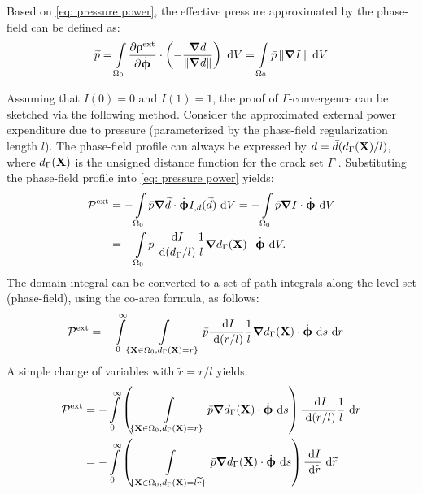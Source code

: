 \begin{remark}
  Based on \eqref{eq: pressure power}, the effective pressure approximated by the phase-field can be defined as:
  \begin{align}
    \widetilde{p} = \int\limits_{\Omega_0} \dfrac{\partial \uprho^\text{ext}}{\partial \dot{\boldsymbol{\upphi}}} \cdot \left( -\dfrac{\boldsymbol{\nabla} d}{\left\lVert\boldsymbol{\nabla} d\right\rVert} \right) \text{ d}V = \int\limits_{\Omega_0} \bar{p} \left\lVert\boldsymbol{\nabla} I\right\rVert \text{ d}V
    \label{eq:pressure_approx}
  \end{align}
\end{remark}

Assuming that $I(0)=0$ and $I(1)=1$, the proof of $\Gamma$-convergence can be sketched via the following method. Consider the approximated external power expenditure due to pressure (parameterized by the phase-field regularization length $l$). The phase-field profile can always be expressed by $d = \bar{d}(d_\Gamma(\textbf{X})/l)$, where $d_\Gamma(\textbf{X})$ is the unsigned distance function for the crack set $\Gamma$ \cite{JYWu2017}. Substituting the phase-field profile into \eqref{eq: pressure power} yields:
\begin{equation}
  \begin{aligned}
    \mathcal{P}^\text{ext} & = - \int\limits_{\Omega_0} \bar{p} \boldsymbol{\nabla} \widetilde{d} \cdot \dot{\boldsymbol{\upphi}} I_{,d}(\widetilde{d}) \text{ d}V = - \int\limits_{\Omega_0} \bar{p} \boldsymbol{\nabla} I \cdot \dot{\boldsymbol{\upphi}} \text{ d}V \\
                           & = - \int\limits_{\Omega_0} \bar{p} \dfrac{\text{ d}I}{\text{ d}(d_\Gamma/l)} \dfrac{1}{l} \boldsymbol{\nabla} d_\Gamma(\textbf{X}) \cdot \dot{\boldsymbol{\upphi}} \text{ d}V.                                    
  \end{aligned}
\end{equation}
The domain integral can be converted to a set of path integrals along the level set (phase-field), using the co-area formula, as follows:
\begin{align}
  \mathcal{P}^\text{ext} & = - \int\limits_0^\infty \int\limits_{\{ \textbf{X}\in{\Omega_0}, d_\Gamma(\textbf{X})=r \}} \bar{p} \dfrac{\text{ d}I}{\text{ d}(r/l)} \dfrac{1}{l} \boldsymbol{\nabla} d_\Gamma(\textbf{X}) \cdot \dot{\boldsymbol{\upphi}} \text{ d}s \text{ d}r 
\end{align}
A simple change of variables with $\widetilde{r}=r/l$ yields:
\begin{equation}
  \begin{aligned}
    \mathcal{P}^\text{ext} & = - \int\limits_0^\infty \left( \int\limits_{\{ \textbf{X}\in{\Omega_0}, d_\Gamma(\textbf{X})=r \}} \bar{p} \boldsymbol{\nabla} d_\Gamma(\textbf{X}) \cdot \dot{\boldsymbol{\upphi}} \text{ d}s \right) \dfrac{\text{ d}I}{\text{ d}(r/l)} \dfrac{1}{l} \text{ d}r                     \\
                           & = - \int\limits_0^\infty \left( \int\limits_{\{ \textbf{X}\in{\Omega_0}, d_\Gamma(\textbf{X})=l\widetilde{r} \}} \bar{p} \boldsymbol{\nabla} d_\Gamma(\textbf{X}) \cdot \dot{\boldsymbol{\upphi}} \text{ d}s \right) \dfrac{\text{ d}I}{\text{ d}\widetilde{r}} \text{ d}\widetilde{r} 
  \end{aligned}
\end{equation}
